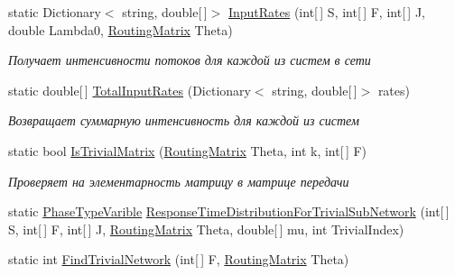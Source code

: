 \begin{DoxyCompactItemize}
\item 
static Dictionary$<$ string, double\mbox{[}$\,$\mbox{]}$>$ \hyperlink{class_exact_network_analysis_1_1_infinity_server_open_fork_join_analizator_a3ade97ca1f8742b8f289bd2a41b2ae89}{Input\+Rates} (int\mbox{[}$\,$\mbox{]} S, int\mbox{[}$\,$\mbox{]} F, int\mbox{[}$\,$\mbox{]} J, double Lambda0, \hyperlink{class_network_descriptions_1_1_routing_matrix}{Routing\+Matrix} Theta)
\begin{DoxyCompactList}\small\item\em Получает интенсивности потоков для каждой из систем в сети \end{DoxyCompactList}\item 
static double\mbox{[}$\,$\mbox{]} \hyperlink{class_exact_network_analysis_1_1_infinity_server_open_fork_join_analizator_aa6f6f71f9d588a2a98ee4b4849013050}{Total\+Input\+Rates} (Dictionary$<$ string, double\mbox{[}$\,$\mbox{]}$>$ rates)
\begin{DoxyCompactList}\small\item\em Возвращает суммарную интенсивность для каждой из систем \end{DoxyCompactList}\item 
static bool \hyperlink{class_exact_network_analysis_1_1_infinity_server_open_fork_join_analizator_a7c4183cc7e1bceeb0fdf5cdad7d72fd8}{Is\+Trivial\+Matrix} (\hyperlink{class_network_descriptions_1_1_routing_matrix}{Routing\+Matrix} Theta, int k, int\mbox{[}$\,$\mbox{]} F)
\begin{DoxyCompactList}\small\item\em Проверяет на элементарность матрицу в матрице передачи \end{DoxyCompactList}\item 
static \hyperlink{class_phase_type_distribution_1_1_phase_type_varible}{Phase\+Type\+Varible} \hyperlink{class_exact_network_analysis_1_1_infinity_server_open_fork_join_analizator_afbb9c04d80ac7e389fae8476862c99e3}{Response\+Time\+Distribution\+For\+Trivial\+Sub\+Network} (int\mbox{[}$\,$\mbox{]} S, int\mbox{[}$\,$\mbox{]} F, int\mbox{[}$\,$\mbox{]} J, \hyperlink{class_network_descriptions_1_1_routing_matrix}{Routing\+Matrix} Theta, double\mbox{[}$\,$\mbox{]} mu, int Trivial\+Index)
\item 
static int \hyperlink{class_exact_network_analysis_1_1_infinity_server_open_fork_join_analizator_a5b22001b6c5c5e048a05754205579e65}{Find\+Trivial\+Network} (int\mbox{[}$\,$\mbox{]} F, \hyperlink{class_network_descriptions_1_1_routing_matrix}{Routing\+Matrix} Theta)

\end{DoxyCompactItemize}
